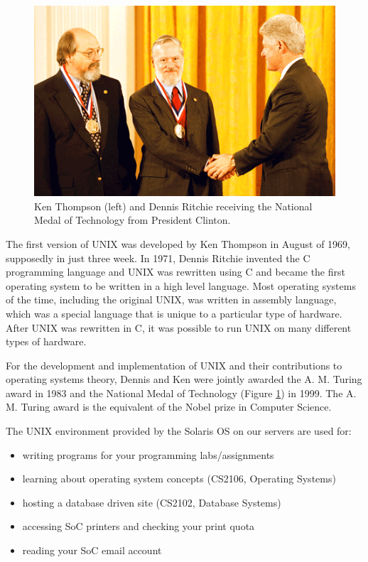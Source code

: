 \begin{frame}
\begin{figure}
\begin{center}\includegraphics[width=0.7\linewidth]{dennis-ken3}\end{center}
\caption{Ken Thompson (left) and Dennis Ritchie receiving the National Medal of
Technology from President Clinton.}
\label{fig:medal}
\end{figure}
\end{frame}

The first version of UNIX was developed by Ken Thompson in August of 1969,
supposedly in just three week. In 1971, Dennis Ritchie invented the C
programming language and UNIX was rewritten using C and became the first
operating system to be written in a high level language. Most operating systems
of the time, including the original UNIX, was written in assembly language,
which was a special language that is unique to a particular type of hardware.
After UNIX was rewritten in C, it was possible to run UNIX on many different
types of hardware.     

For the development and implementation of UNIX and their contributions to
operating systems theory, Dennis and Ken were jointly awarded the A. M. Turing
award in 1983 and the National Medal of Technology (Figure \ref{fig:medal}) in
1999. The A. M. Turing award is the equivalent of the Nobel prize in Computer
Science.  
\begin{frame}
The UNIX environment provided by the Solaris OS on our servers are used for:
\begin{itemize}
\item writing programs for your programming labs/assignments
\item learning about operating system concepts (CS2106, Operating Systems)
\item hosting a database driven site (CS2102, Database Systems)
\item accessing SoC printers and checking your print quota
\item reading your SoC email account
\end{itemize}
\end{frame}

